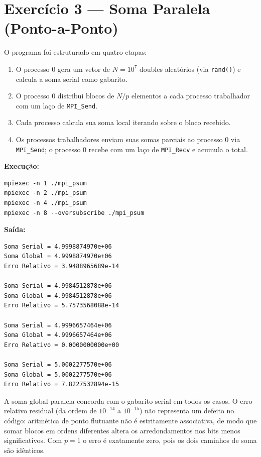 \documentclass[12pt,a4paper]{article}
\begin{document}
\section{Exercício 3 — Soma Paralela (Ponto-a-Ponto)}

O programa foi estruturado em quatro etapas:

\begin{enumerate}
  \item O processo 0 gera um vetor de $N = 10^7$ doubles aleatórios (via \texttt{rand()}) e calcula a soma serial como gabarito.
  \item O processo 0 distribui blocos de $N/p$ elementos a cada processo trabalhador com um laço de \texttt{MPI\_Send}.
  \item Cada processo calcula sua soma local iterando sobre o bloco recebido.
  \item Os processos trabalhadores enviam suas somas parciais ao processo 0 via \texttt{MPI\_Send}; o processo 0 recebe com um laço de \texttt{MPI\_Recv} e acumula o total.
\end{enumerate}

\textbf{Execução:}
\begin{lstlisting}[style=shell]
mpiexec -n 1 ./mpi_psum
mpiexec -n 2 ./mpi_psum
mpiexec -n 4 ./mpi_psum
mpiexec -n 8 --oversubscribe ./mpi_psum
\end{lstlisting}

\textbf{Saída:}
\begin{lstlisting}[style=shell]
Soma Serial = 4.9998874970e+06
Soma Global = 4.9998874970e+06
Erro Relativo = 3.9488965689e-14

Soma Serial = 4.9984512878e+06
Soma Global = 4.9984512878e+06
Erro Relativo = 5.7573568088e-14

Soma Serial = 4.9996657464e+06
Soma Global = 4.9996657464e+06
Erro Relativo = 0.0000000000e+00

Soma Serial = 5.0002277570e+06
Soma Global = 5.0002277570e+06
Erro Relativo = 7.8227532894e-15
\end{lstlisting}

A soma global paralela concorda com o gabarito serial em todos os casos. O erro relativo residual (da ordem de $10^{-14}$ a $10^{-15}$) não representa um defeito no código: aritmética de ponto flutuante não é estritamente associativa, de modo que somar blocos em ordens diferentes altera os arredondamentos nos bits menos significativos. Com $p=1$ o erro é exatamente zero, pois os dois caminhos de soma são idênticos.
\end{document}
